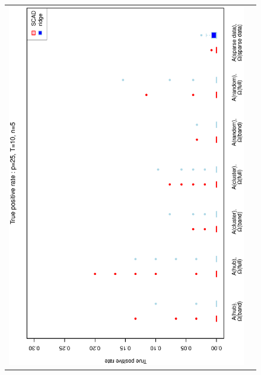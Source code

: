 \documentclass[a4paper]{article}
\begin{document}
\begin{figure}[h!]
\centering
\begin{tabular}{cc}
\includegraphics[scale=0.5,angle=270]{ROCtpr25T10N5a.eps}\\

\end{tabular}
\end{figure}
\end{document}
